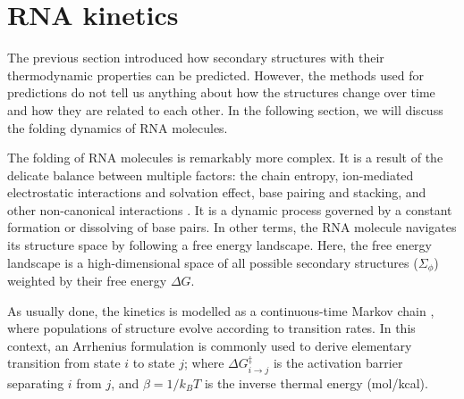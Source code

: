 \section{RNA kinetics} %
The previous section introduced how secondary structures with their thermodynamic properties can be predicted. However, the methods used for predictions do not tell us anything about how the structures change over time and how they are related to each other. In the following section, we will discuss the folding dynamics of RNA molecules. 

The folding of RNA molecules is remarkably more complex. It is a result of the delicate balance between multiple factors: the chain entropy, ion-mediated electrostatic interactions and solvation effect, base pairing and stacking, and other non-canonical interactions \cite{chen2008rna}. It is a dynamic process governed by a constant formation or dissolving of base pairs. In other terms, the RNA molecule navigates its structure space by following a free energy landscape. Here, the free energy landscape is a high-dimensional space of all possible secondary structures ($\Sigma_{\phi}$) weighted by their free energy $\Delta G$.  


As usually done, the kinetics is modelled as a continuous-time Markov chain \cite{lorenz20_effic_comput_base_probab_multi_rna_foldin}, where populations of structure evolve according to transition rates. In this context, an Arrhenius formulation is commonly used to derive elementary transition from state $i$ to state $j$; where \(\Delta G^{\ddagger}_{i \rightarrow j}\) is the activation barrier separating \(i\) from \(j\), and \(\beta=1/k_BT\) is the inverse thermal energy (mol/kcal). 

